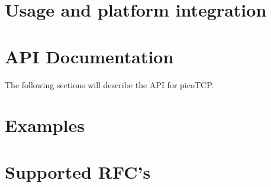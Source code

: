\chapter{Usage and platform integration}
\label{chap:usage}



\chapter{API Documentation}
\label{chap:api_doc}
The following sections will describe the API for picoTCP.






\chapter{Examples}
\label{chap:examples}
%

\appendix

\chapter{Supported RFC's}
\label{chap:rfcs}



